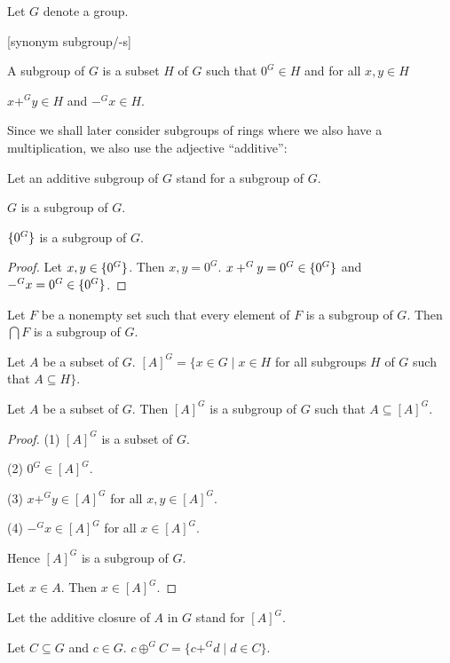 \documentclass[english,11pt]{article}
\begin{document}
\begin{forthel}

Let $G$ denote a group. 

[synonym subgroup/-s]

\begin{definition} A subgroup of $G$ is a subset $H$ of $G$ such that
$0^{G} \in H$ and for all $x,y \in H$ 

$x +^{G} y \in H$ and $-^{G} x \in H$.
\end{definition}

\end{forthel}
Since we shall later consider subgroups of rings where we also have a multiplication,
we also use the adjective ``additive'':
\begin{forthel}

Let an additive subgroup of $G$ stand for a subgroup of $G$.

\begin{lemma} $G$ is a subgroup of $G$. \end{lemma}

\begin{lemma} $\{0^{G}\}$ is a subgroup of $G$.
\end{lemma}

\begin{proof}
Let $x,y \in \{0^{G}\}$. Then $x,y = 0^{G}$.
$x +^{G} y = 0^{G} \in \{0^{G}\}$ and $-^{G} x = 0^{G} \in \{0^{G}\}$.
\end{proof}

\begin{lemma} Let $F$ be a nonempty set such that every element of $F$ is a subgroup of $G$.
Then $\bigcap F$ is a subgroup of $G$.
\end{lemma}

\begin{definition}
Let $A$ be a subset of $G$.
$[A]^{G} = \{x \in G \mid x \in H$ for all subgroups $H$ of $G$ 
such that $A \subseteq H\}$.
\end{definition}

\begin{lemma}
Let $A$ be a subset of $G$. Then $[A]^{G}$ is a subgroup of $G$ such
that $A \subseteq [A]^{G}$.
\end{lemma}
\begin{proof}

(1) $[A]^{G}$ is a subset of $G$.

(2) $0^{G} \in [A]^{G}$.

(3) $x +^{G} y \in [A]^{G}$ for all $x,y \in [A]^{G}$.

(4) $-^{G} x \in [A]^{G}$ for all $x \in [A]^{G}$.

Hence $[A]^{G}$ is a subgroup of $G$.

Let $x \in A$. 
Then $x \in [A]^{G}$.
\end{proof}

Let the additive closure of $A$ in $G$ stand for $[A]^{G}$.

\begin{definition}
Let $C \subseteq G$ and $c \in G$.
$c \oplus^{G} C = \{c +^{G} d \mid d \in C\}$.
\end{definition}
\end{forthel}
\end{document}

